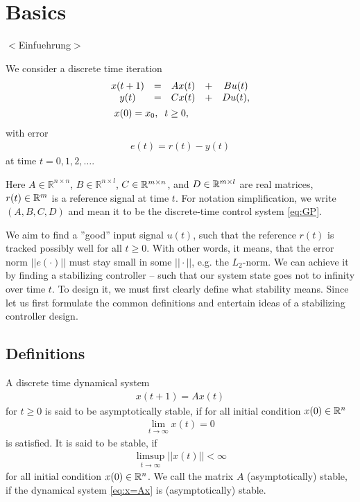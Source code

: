 \chapter{Basics} 
\label{ChGrDef}
{\color{red}$<$Einfuehrung$>$}

We consider a  discrete time iteration
\begin{align}
\label{eq:GP}
&\begin{array}{c c c c c}
x(t+1) &= &A x(t)& + &B u(t)  \\
y ( t) &= &C x(t)&  + &D u(t),\\ 
\end{array}\\
&\; \;\;x(0) =x_0 , \; \;  t \geq 0,
\end{align}
 with error 
\begin{align}
\label{eq:error}
e(t) =r(t) - y(t)
\end{align}
at time $t  = 0, 1, 2, \dots$.

Here $A \in \mathbb{R}^{n\times n}$, $B \in \mathbb{R}^{n \times l}$, $C \in {\mathbb{R}}^{m \times n}$, and $D \in {\mathbb{R}}^{m\times l}$ are real matrices, $r(t) \in {\mathbb{R}}^{m}$ is a reference signal at time $t$. For notation simplification, we write $(A, B,C,D)$ and mean it to be the discrete-time control system \eqref{eq:GP}.



We aim to find a ''good'' input signal $u(t)$, such that the reference $r(t)$ is tracked possibly well for all $t \geq 0$. With other words, it means, that the error norm $||e(\cdot)||$ must stay small in some  $||\cdot||$, e.g. the $L_2$-norm.
We can achieve it by finding a stabilizing controller -- such that our system state goes not to infinity over time $t$. 
To design it, we must first clearly define what stability means. Since let us first formulate the common definitions and entertain ideas of a stabilizing controller design. 

\section{Definitions}

\begin{defi}
	A discrete time dynamical system
	\begin{align}
	\label{eq:x=Ax}
	x(t+1) = A x(t)
	\end{align}
	for $t \geq 0$ 
	is said to be asymptotically stable, if for all initial condition $x(0) \in {\mathbb{R}}^n$
	\begin{align}
	\lim_{t \to \infty} x(t) = 0
	\end{align}	
    is satisfied. 
	It is said to be stable, if 
	\begin{align}
	\limsup_{t \to \infty} ||x(t)|| < \infty
	\end{align}
	for all	 initial condition $x(0) \in {\mathbb{R}}^n$.
	We call the matrix $A$ (asymptotically) stable, if the dynamical system \eqref{eq:x=Ax} is (asymptotically) stable.
\end{defi}


